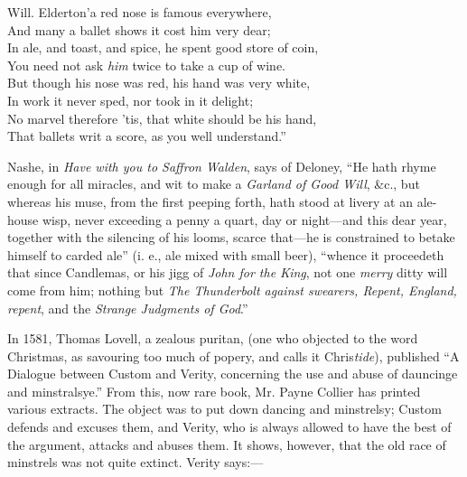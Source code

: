 \settowidth{\versewidth}{Will. Elderton’a red nose is famous everywhere,}
\begin{scverse}
Will. Elderton’a red nose is famous everywhere,\\
And many a ballet shows it cost him very dear;\\
In ale, and toast, and spice, he spent good store of coin,\\
You need not ask \textit{him} twice to take a cup of wine.\\
But though his nose was red, his hand was very white,\\
In work it never sped, nor took in it delight;\\
No marvel therefore ’tis, that white should be his hand,\\
That ballets writ a score, as you well understand.”
\end{scverse}

Nashe, in \textit{Have with you to Saffron Walden}, says of Deloney, “He hath rhyme
enough for all miracles, and wit to make a \textit{Garland of Good Will}, \&c., but
whereas his muse, from the first peeping forth, hath stood at livery at an ale-house
wisp, never exceeding a penny a quart, day or night—and this dear year,
together with the silencing of his looms, scarce that—he is constrained to betake
himself to carded ale” (i. e., ale mixed with small beer), “whence it proceedeth
that since Candlemas, or his jigg of \textit{John for the King}, not one \textit{merry} ditty will
come from him; nothing but \textit{The Thunderbolt against swearers, Repent, England,
repent}, and the \textit{Strange Judgments of God}.”

In 1581, Thomas Lovell, a zealous puritan, (one who objected to the word
Christmas, as savouring too much of popery, and calls it Chris\textit{tide}), published
“A Dialogue between Custom and Verity, concerning the use and abuse of
dauncinge and minstralsye.” From this, now rare book, Mr. Payne Collier has
printed various extracts. The object was to put down dancing and minstrelsy;
Custom defends and excuses them, and Verity, who is always allowed to have the
best of the argument, attacks and abuses them. It shows, however, that the old
race of minstrels was not quite extinct. Verity says:—

